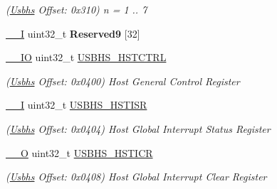 \begin{DoxyCompactItemize}
\begin{DoxyCompactList}\small\item\em (\mbox{\hyperlink{structUsbhs}{Usbhs}} Offset\+: 0x310) n = 1 .. 7 \end{DoxyCompactList}\item 
\mbox{\label{structUsbhs_a480c9145ea7c4a456534a91702a90a27}} 
\mbox{\hyperlink{core__cm7_8h_af63697ed9952cc71e1225efe205f6cd3}{\+\_\+\+\_\+I}} uint32\+\_\+t {\bfseries Reserved9} \mbox{[}32\mbox{]}
\item 
\mbox{\label{structUsbhs_a22e42d95971da08f5fb0f3bdad56f9ee}} 
\mbox{\hyperlink{core__cm7_8h_aec43007d9998a0a0e01faede4133d6be}{\+\_\+\+\_\+\+IO}} uint32\+\_\+t \mbox{\hyperlink{structUsbhs_a22e42d95971da08f5fb0f3bdad56f9ee}{U\+S\+B\+H\+S\+\_\+\+H\+S\+T\+C\+T\+RL}}
\begin{DoxyCompactList}\small\item\em (\mbox{\hyperlink{structUsbhs}{Usbhs}} Offset\+: 0x0400) Host General Control Register \end{DoxyCompactList}\item 
\mbox{\label{structUsbhs_abbc4ab3312b07a4b7bce1d7d06942b28}} 
\mbox{\hyperlink{core__cm7_8h_af63697ed9952cc71e1225efe205f6cd3}{\+\_\+\+\_\+I}} uint32\+\_\+t \mbox{\hyperlink{structUsbhs_abbc4ab3312b07a4b7bce1d7d06942b28}{U\+S\+B\+H\+S\+\_\+\+H\+S\+T\+I\+SR}}
\begin{DoxyCompactList}\small\item\em (\mbox{\hyperlink{structUsbhs}{Usbhs}} Offset\+: 0x0404) Host Global Interrupt Status Register \end{DoxyCompactList}\item 
\mbox{\label{structUsbhs_ad72a0aad6faff97ed88f5c919e586d70}} 
\mbox{\hyperlink{core__cm7_8h_a7e25d9380f9ef903923964322e71f2f6}{\+\_\+\+\_\+O}} uint32\+\_\+t \mbox{\hyperlink{structUsbhs_ad72a0aad6faff97ed88f5c919e586d70}{U\+S\+B\+H\+S\+\_\+\+H\+S\+T\+I\+CR}}
\begin{DoxyCompactList}\small\item\em (\mbox{\hyperlink{structUsbhs}{Usbhs}} Offset\+: 0x0408) Host Global Interrupt Clear Register \end{DoxyCompactList}\item 
\mbox{\label{structUsbhs_a60a9b6a0c97b661c9d64a26801175161}} 

\end{DoxyCompactItemize}
